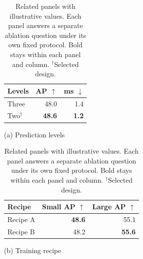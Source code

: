\begin{table}[!htbp]
\centering\small
\begin{minipage}[t]{0.46\textwidth}
\centering
\begin{tabular}{lrr}
\toprule
Levels & AP $\uparrow$ & ms $\downarrow$ \\
\midrule
Three & 48.0 & 1.4 \\
Two$^{\dagger}$ & \textbf{48.6} & \textbf{1.2} \\
\bottomrule
\end{tabular}
\par\smallskip (a) Prediction levels
\end{minipage}\hfill
\begin{minipage}[t]{0.46\textwidth}
\centering
\begin{tabular}{lrr}
\toprule
Recipe & Small AP $\uparrow$ & Large AP $\uparrow$ \\
\midrule
Recipe A & \textbf{48.6} & 55.1 \\
Recipe B & 48.2 & \textbf{55.6} \\
\bottomrule
\end{tabular}
\par\smallskip (b) Training recipe
\end{minipage}
\caption{Related panels with illustrative values. Each panel answers a separate ablation question under its own fixed protocol. Bold stays within each panel and column. $^{\dagger}$Selected design.}
\label{tab:multi-panel}
\end{table}
